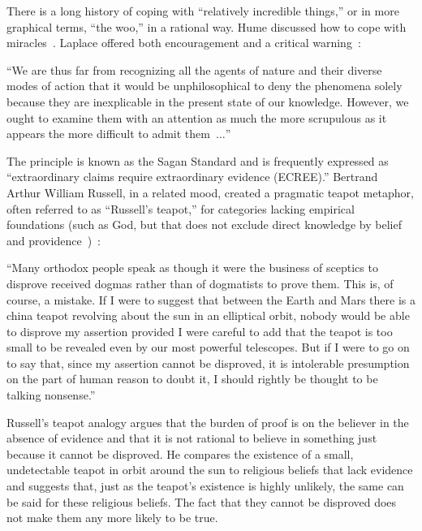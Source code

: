 There is a long history of coping with ``relatively incredible things,'' or in more graphical terms, ``the woo,'' in a rational way.
Hume discussed how to cope with miracles~\cite{Hume-Enquiry,frank,franke}.
Laplace offered both encouragement and a critical warning~\cite{Laplace1814,Flournoy1900}:
\begin{svgraybox}
``We are thus far from recognizing all the agents of nature and their diverse modes of action
that it would be unphilosophical to deny the phenomena solely because they are inexplicable in the present state of our knowledge.
However, we ought
to examine them with an attention as much the more scrupulous as it appears the more difficult to admit them~$\ldots$''
\end{svgraybox}
The principle is known as the Sagan Standard and is frequently expressed as ``extraordinary claims require extraordinary evidence (ECREE).''
Bertrand Arthur William Russell, in a related mood, created a pragmatic teapot metaphor, often referred to as ``Russell's teapot,''
for categories lacking empirical foundations (such as God,
but that does not exclude direct knowledge by belief and providence~\cite{Sagan-Contact})~\cite{Russell1952}:
\begin{svgraybox}
``Many orthodox people speak as though it were the business of sceptics
to disprove received dogmas rather than of dogmatists to prove them. This
is, of course, a mistake. If I were to suggest that between the Earth and
Mars there is a china teapot revolving about the sun in an elliptical orbit,
nobody would be able to disprove my assertion provided I were careful to
add that the teapot is too small to be revealed even by our most powerful
telescopes. But if I were to go on to say that, since my assertion cannot be
disproved, it is intolerable presumption on the part of human reason to
doubt it, I should rightly be thought to be talking nonsense.''
\end{svgraybox}

Russell's teapot analogy argues that the burden of proof is on the believer in the absence of evidence
and that it is not rational to believe in something just because it cannot be disproved.
He compares the existence of a small, undetectable teapot in orbit around the sun to religious beliefs
that lack evidence and suggests that, just as the teapot's existence is highly unlikely, the same can be said for these religious beliefs.
The fact that they cannot be disproved does not make them any more likely to be true.

